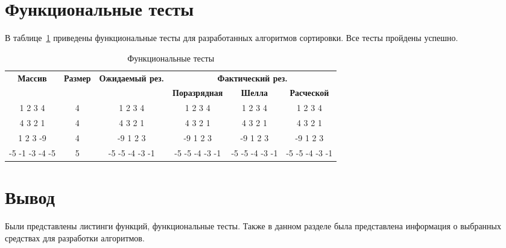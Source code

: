 

\clearpage

\section{Функциональные тесты}
В таблице~\ref{tab:tests} приведены функциональные тесты для разработанных алгоритмов сортировки. Все тесты пройдены успешно.

\begin{table}[ht]
	\small
	\begin{center}
		\begin{threeparttable}
			\caption{Функциональные тесты}
			\label{tab:tests}
			\begin{tabular}{|c|c|c|c|c|c|}
				\hline
				\bfseries Массив
				& \bfseries Размер
				& \bfseries Ожидаемый рез.
				& \multicolumn{3}{c|}{\bfseries Фактический рез.} \\ \cline{4-6}
				& & & \bfseries Поразрядная & \bfseries Шелла & \bfseries Расческой \\
				\hline
				1 2 3 4  & 4 & 1 2 3 4 & 1 2 3 4 & 1 2 3 4 & 1 2 3 4 \\
				\hline
				4 3 2 1 & 4 & 4 3 2 1 & 4 3 2 1 & 4 3 2 1 & 4 3 2 1 \\
				\hline
				1 2 3 -9 & 4 & -9 1 2 3  & -9 1 2 3 & -9 1 2 3 & -9 1 2 3 \\
				\hline
				-5 -1 -3 -4 -5 & 5 & -5 -5 -4 -3 -1 & -5 -5 -4 -3 -1 & -5 -5 -4 -3 -1 & -5 -5 -4 -3 -1 \\
				\hline
			\end{tabular}	
		\end{threeparttable}	
	\end{center}
\end{table}

\section*{Вывод}
Были представлены листинги функций, функциональные тесты.
Также в данном разделе была представлена информация о выбранных средствах для разработки алгоритмов.